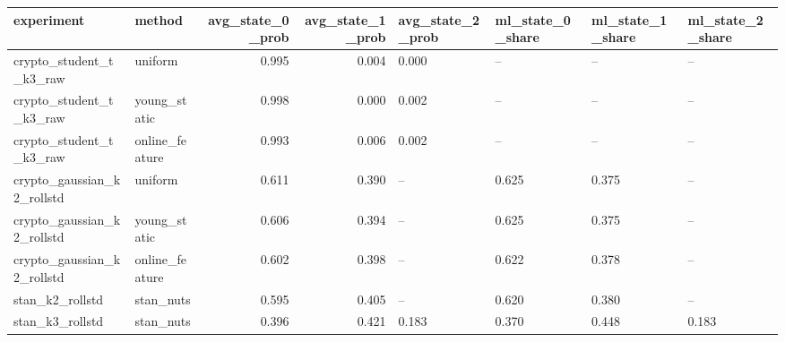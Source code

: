 \begin{tabular}{llrrllll}
\toprule
experiment & method & avg\_state\_0\_prob & avg\_state\_1\_prob & avg\_state\_2\_prob & ml\_state\_0\_share & ml\_state\_1\_share & ml\_state\_2\_share \\
\midrule
crypto\_student\_t\_k3\_raw & uniform & 0.995 & 0.004 & 0.000 & -- & -- & -- \\
crypto\_student\_t\_k3\_raw & young\_static & 0.998 & 0.000 & 0.002 & -- & -- & -- \\
crypto\_student\_t\_k3\_raw & online\_feature & 0.993 & 0.006 & 0.002 & -- & -- & -- \\
crypto\_gaussian\_k2\_rollstd & uniform & 0.611 & 0.390 & -- & 0.625 & 0.375 & -- \\
crypto\_gaussian\_k2\_rollstd & young\_static & 0.606 & 0.394 & -- & 0.625 & 0.375 & -- \\
crypto\_gaussian\_k2\_rollstd & online\_feature & 0.602 & 0.398 & -- & 0.622 & 0.378 & -- \\
stan\_k2\_rollstd & stan\_nuts & 0.595 & 0.405 & -- & 0.620 & 0.380 & -- \\
stan\_k3\_rollstd & stan\_nuts & 0.396 & 0.421 & 0.183 & 0.370 & 0.448 & 0.183 \\
\bottomrule
\end{tabular}
